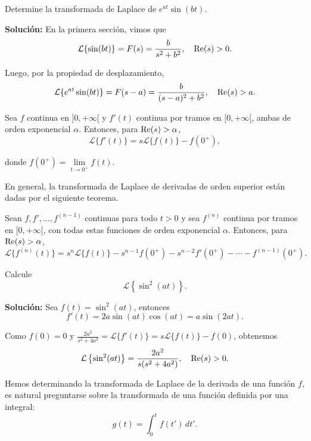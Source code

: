 \begin{ejemplo}
    Determine la transformada de Laplace de $e^{at} \sin(bt)$.

    \textbf{Solución:} En la primera sección, vimos que
    $$\mathcal{L}\{\sin(bt)\} = F(s) = \frac{b}{s^2+b^2}, \quad \operatorname{Re}(s) > 0.$$

    Luego, por la propiedad de desplazamiento,
    $$\mathcal{L}\{e^{at} \sin(bt)\} = F(s-a) = \frac{b}{(s-a)^2+b^2}, \quad \operatorname{Re}(s) > a.$$
\end{ejemplo}

\begin{teorema}
    Sea $f$ continua en $]0, + \infty [$ y $f'(t)$ continua por tramos en $[0, + \infty[$, ambas de orden exponencial $\alpha$. Entonces, para $\operatorname{Re}(s) > \alpha$,
    $$\mathcal{L}\{f'(t)\} = s \mathcal{L}\{f(t)\} - f(0^+),$$

    donde $f(0^+) = \lim\limits_{t \to 0^+} f(t)$. 
\end{teorema}

En general, la transformada de Laplace de derivadas de orden superior están dadas por el siguiente teorema.

\begin{teorema}
 Sean $f, f', \dots, f^{(n-1)}$ continuas para todo $t>0$ y sea $f^{(n)}$ continua por tramos en $[0,+\infty[$, con todas estas funciones de orden exponencial $\alpha$. Entonces, para $\operatorname{Re}(s) > \alpha$,
$$\mathcal{L}\{f^{(n)}(t)\} = s^n \mathcal{L}\{f(t)\} - s^{n-1} f(0^+) - s^{n-2} f'(0^+) - \cdots - f^{(n-1)}(0^+). \label{LaplaceDerivada}$$

\end{teorema}

\begin{ejemplo}
Calcule 
$$\mathcal{L}\left\{\sin^2(at)\right\}.$$   

\textbf{Solución:} Sea $f(t) = \sin^2(at)$, entonces
$$f'(t) = 2a \sin(at) \cos(at) = a \sin(2at).$$

Como $f(0) = 0$ y $\frac{2a^2}{s^2+4a^2} = \mathcal{L}\{f'(t)\} = s \mathcal{L}\{f(t)\} - f(0)$, obtenemos
$$\mathcal{L}\left\{\sin^2(at)\right\} = \frac{2a^2}{s(s^2+4a^2)}, \quad \operatorname{Re}(s) > 0.$$
\end{ejemplo}

Hemos determinando la transformada de Laplace de la derivada de una función $f$, es natural preguntarse sobre la transformada de una función definida por una integral:
$$g(t) = \int_0^t f(t') \,dt'.$$

